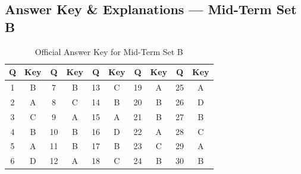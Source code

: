 \newpage
\subsection*{Answer Key \& Explanations --- Mid-Term Set B}

\begin{table}[h]
\centering\small
\begin{tabular}{|c|c||c|c||c|c||c|c||c|c|}
\hline
\textbf{Q} & \textbf{Key} & \textbf{Q} & \textbf{Key} & \textbf{Q} & \textbf{Key} & \textbf{Q} & \textbf{Key} & \textbf{Q} & \textbf{Key} \\ \hline
1 & B & 7 & B & 13 & C & 19 & A & 25 & A \\ \hline
2 & A & 8 & C & 14 & B & 20 & B & 26 & D \\ \hline
3 & C & 9 & A & 15 & A & 21 & B & 27 & B \\ \hline
4 & B & 10 & B & 16 & D & 22 & A & 28 & C \\ \hline
5 & A & 11 & B & 17 & B & 23 & C & 29 & A \\ \hline
6 & D & 12 & A & 18 & C & 24 & B & 30 & B \\ \hline
\end{tabular}
\caption{Official Answer Key for Mid-Term Set B}
\end{table}

\newpage
